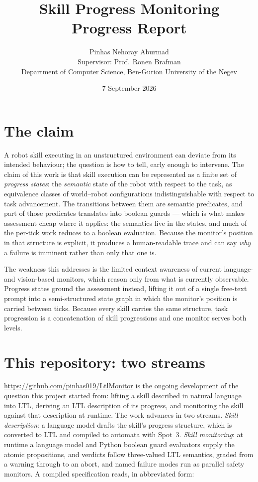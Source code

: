\documentclass[11pt,a4paper]{article}
\title{\vspace{-1.2cm}Skill Progress Monitoring\\[2pt]\large Progress Report}
\author{Pinhas Nehoray Aburmad\\
  \small Supervisor: Prof.\ Ronen Brafman\\
  \small Department of Computer Science, Ben-Gurion University of the Negev}
\date{\small 7 September 2026}
\begin{document}
\maketitle
\vspace{-1.0cm}

\section{The claim}

A robot skill executing in an unstructured environment can deviate from its intended
behaviour; the question is how to tell, early enough to intervene. The claim of this work
is that skill execution can be represented as a finite set of \emph{progress states}: the
\emph{semantic} state of the robot with respect to the task, as equivalence classes of
world--robot configurations indistinguishable with respect to task advancement. The
transitions between them are semantic predicates, and part of those predicates translates
into boolean guards --- which is what makes assessment cheap where it applies: the semantics
live in the states, and much of the per-tick work reduces to a boolean evaluation. Because
the monitor's position in that structure is explicit, it produces a human-readable trace and
can say \emph{why} a failure is imminent rather than only that one is.

The weakness this addresses is the limited context awareness of current language- and
vision-based monitors, which reason only from what is currently observable. Progress states
ground the assessment instead, lifting it out of a single free-text prompt into a
semi-structured state graph in which the monitor's position is carried between ticks. Because
every skill carries the same structure, task progression is a concatenation of skill
progressions and one monitor serves both levels.

\section{This repository: two streams}

\url{https://github.com/pinhas019/LtlMonitor} is the ongoing development of the question
this project started from: lifting a skill described in natural language into LTL, deriving
an LTL description of its progress, and monitoring the skill against that description at
runtime. The work advances in two streams. \emph{Skill description}: a language model
drafts the skill's progress structure, which is converted to LTL and compiled to automata
with Spot~3. \emph{Skill monitoring}: at runtime a language model and Python boolean guard
evaluators supply the atomic propositions, and verdicts follow three-valued LTL semantics,
graded from a warning through to an abort, and named failure modes run as parallel safety
monitors. A compiled specification reads, in abbreviated form:
\end{document}
